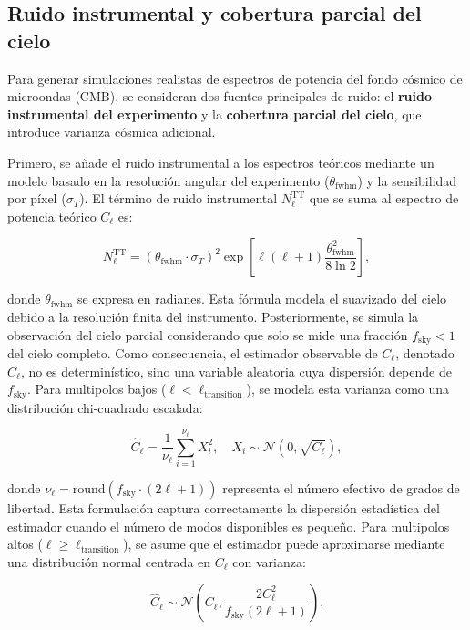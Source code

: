 \documentclass[11pt]{article}
\begin{document}
\subsection{Ruido instrumental y cobertura parcial del cielo}
Para generar simulaciones realistas de espectros de potencia del fondo cósmico de microondas (CMB), se consideran dos fuentes principales de ruido: el \textbf{ruido instrumental del experimento} y la \textbf{cobertura parcial del cielo}, que introduce varianza cósmica adicional.

Primero, se añade el ruido instrumental a los espectros teóricos mediante un modelo basado en la resolución angular del experimento (\(\theta_{\text{fwhm}}\)) y la sensibilidad por píxel (\(\sigma_T\)). El término de ruido instrumental \(N_\ell^{\mathrm{TT}}\) que se suma al espectro de potencia teórico \(C_\ell\) es:

\begin{equation}
N_\ell^{\mathrm{TT}} = \left(\theta_{\text{fwhm}} \cdot \sigma_T \right)^2 \exp\left[ \ell (\ell + 1) \frac{\theta_{\text{fwhm}}^2}{8 \ln 2} \right],
\end{equation}

donde \(\theta_{\text{fwhm}}\) se expresa en radianes. Esta fórmula modela el suavizado del cielo debido a la resolución finita del instrumento. Posteriormente, se simula la observación del cielo parcial considerando que solo se mide una fracción \(f_{\text{sky}} < 1\) del cielo completo. Como consecuencia, el estimador observable de \(C_\ell\), denotado \(\hat{C}_\ell\), no es determinístico, sino una variable aleatoria cuya dispersión depende de \(f_{\text{sky}}\). Para multipolos bajos (\(\ell < \ell_{\text{transition}}\)), se modela esta varianza como una distribución chi-cuadrado escalada:

\begin{equation}
\hat{C}_\ell = \frac{1}{\nu_\ell} \sum_{i=1}^{\nu_\ell} X_i^2, \quad X_i \sim \mathcal{N}(0, \sqrt{C_\ell}),
\end{equation}

donde \(\nu_\ell = \text{round}(f_{\text{sky}} \cdot (2\ell + 1))\) representa el número efectivo de grados de libertad. Esta formulación captura correctamente la dispersión estadística del estimador cuando el número de modos disponibles es pequeño. Para multipolos altos (\(\ell \geq \ell_{\text{transition}}\)), se asume que el estimador puede aproximarse mediante una distribución normal centrada en \(C_\ell\) con varianza:

\begin{equation}
\hat{C}_\ell \sim \mathcal{N}\left(C_\ell, \frac{2 C_\ell^2}{f_{\text{sky}} (2\ell + 1)} \right).
\end{equation}
\end{document}
